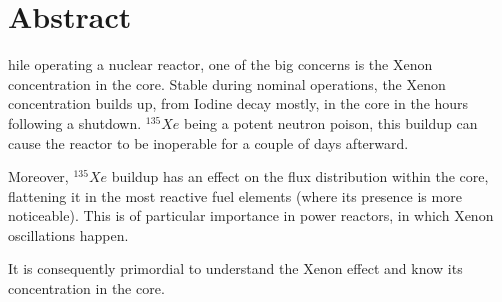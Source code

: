 %
%
%

\chapter*{Abstract}
\begin{SingleSpace}
hile operating a nuclear reactor, one of the big concerns is the Xenon concentration in the core. Stable during nominal operations, the Xenon concentration builds up, from Iodine decay mostly, in the core in the hours following a shutdown. $^{135}Xe$ being a potent neutron poison, this buildup can cause the reactor to be inoperable for a couple of days afterward.

Moreover, $^{135}Xe$ buildup has an effect on the flux distribution within the core, flattening it in the most reactive fuel elements (where its presence is more noticeable). This is of particular importance in power reactors, in which Xenon oscillations happen.

It is consequently primordial to understand the Xenon effect and know its concentration in the core.

\end{SingleSpace}
\clearpage
